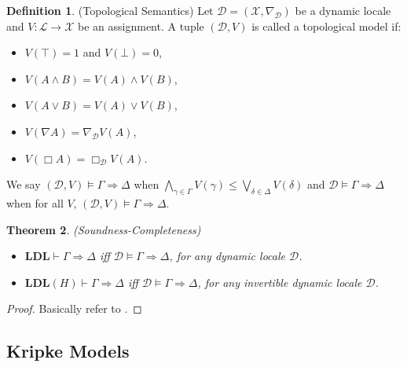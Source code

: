 \documentclass[12pt,a4paper]{article}
\theoremstyle{plain}
\newtheorem{thm}{Theorem}[section]
\theoremstyle{definition}
\newtheorem{dfn}[thm]{Definition}
\begin{document}
\begin{dfn}\label{t4-1}(Topological Semantics)
Let $\mathcal{D}=(\mathscr{X}, \nabla_{\mathcal{D}})$ be a dynamic locale and $V:\mathcal{L} \to\mathscr{X}$ be an assignment. A tuple $(\mathcal{D}, V)$ is called a topological model if:
\begin{itemize}
\item[$\bullet$]
$V(\top)=1$ and $V(\bot)=0$,
\item[$\bullet$]
$V(A \wedge B)=V(A) \wedge V(B)$,
\item[$\bullet$]
$V(A \vee B)=V(A) \vee V(B)$,
\item[$\bullet$]
$V(\nabla A)=\nabla_{\mathcal{D}} V(A)$,
\item[$\bullet$]
$V(\Box A)= \Box_{\mathcal{D}} V(A)$.
\end{itemize}
We say $(\mathcal{D}, V) \vDash \Gamma \Rightarrow \Delta$ when $\bigwedge_{\gamma \in \Gamma} V(\gamma) \leq \bigvee_{\delta \in \Delta} V(\delta)$ and $\mathcal{D} \vDash \Gamma \Rightarrow \Delta$ when for all $V$, $(\mathcal{D}, V) \vDash \Gamma \Rightarrow \Delta$.
\end{dfn}

\begin{thm}\label{t4-2}(Soundness-Completeness)
\begin{itemize}
\item[$(i)$]
$ \mathbf{LDL} \vdash \Gamma \Rightarrow \Delta$ iff $\mathcal{D} \vDash \Gamma \Rightarrow \Delta$, for any dynamic locale $\mathcal{D}$.
\item[$(ii)$]
$ \mathbf{LDL}(H) \vdash \Gamma \Rightarrow \Delta$ iff $\mathcal{D} \vDash \Gamma \Rightarrow \Delta$,  for any invertible dynamic locale $\mathcal{D}$.
\end{itemize}

\end{thm}
\begin{proof}
Basically refer to \cite{Amir}.
\end{proof}

\subsection{Kripke Models} \label{KripkeModels}
\end{document}
